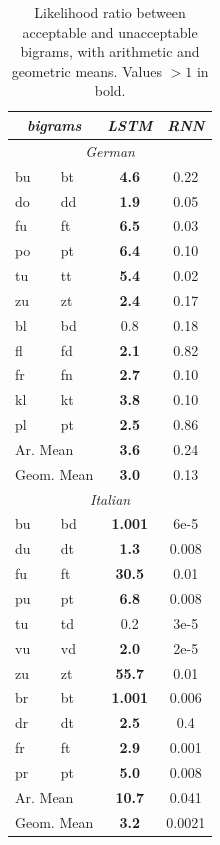 \begin{table}[t]
  \begin{center}
    \begin{tabular}{ll|cc}
      \multicolumn{2}{c}{\emph{bigrams}}&\emph{LSTM}&\emph{RNN}\\
      \hline
      \multicolumn{4}{c}{\emph{German}}\\
      \hline
           bu &  bt &  \textbf{ 4.6} &  0.22     \\
           do &  dd &  \textbf{ 1.9} &  0.05     \\
           fu &  ft &  \textbf{ 6.5} &  0.03     \\
           po &  pt &  \textbf{ 6.4} &  0.10     \\
           tu &  tt &  \textbf{ 5.4} &  0.02     \\
           zu &  zt &  \textbf{ 2.4} &  0.17     \\ \hline
           bl &  bd &   0.8          & 0.18       \\
           fl &  fd &  \textbf{ 2.1} & 0.82      \\
           fr &  fn &  \textbf{ 2.7} & 0.10      \\
           kl &  kt &  \textbf{ 3.8} & 0.10      \\
           pl &  pt &  \textbf{ 2.5} & 0.86      \\
	    \multicolumn{2}{l|}{Ar. Mean}      & \textbf{3.6} & 0.24 \\
	    \multicolumn{2}{l|}{Geom. Mean} & \textbf{3.0} & 0.13 \\
      \hline
      \multicolumn{4}{c}{\emph{Italian}}\\
      \hline
	    bu & bd & \textbf{ 1.001} & 6e-5 \\
	    du & dt & \textbf{ 1.3} & 0.008 \\
	    fu & ft & \textbf{ 30.5} & 0.01 \\
	    pu & pt & \textbf{ 6.8} & 0.008 \\
	    tu & td &  0.2 & 3e-5 \\
	    vu & vd & \textbf{ 2.0} & 2e-5 \\
	    zu & zt & \textbf{ 55.7} & 0.01 \\ \hline
	    br & bt & \textbf{ 1.001}  &  0.006 \\
	    dr & dt & \textbf{ 2.5} & 0.4 \\
	    fr & ft & \textbf{ 2.9} & 0.001 \\
	    pr & pt & \textbf{ 5.0} & 0.008 \\
	    \multicolumn{2}{l|}{Ar. Mean} & \textbf{10.7}  & 0.041  \\
	    \multicolumn{2}{l|}{Geom. Mean} & \textbf{3.2} & 0.0021 \\
    \end{tabular}
  \end{center}
  \caption{\label{tab:phonotactics-results} Likelihood ratio between acceptable and unacceptable bigrams, with arithmetic and geometric means. Values $>1$ in bold.}
\end{table}

